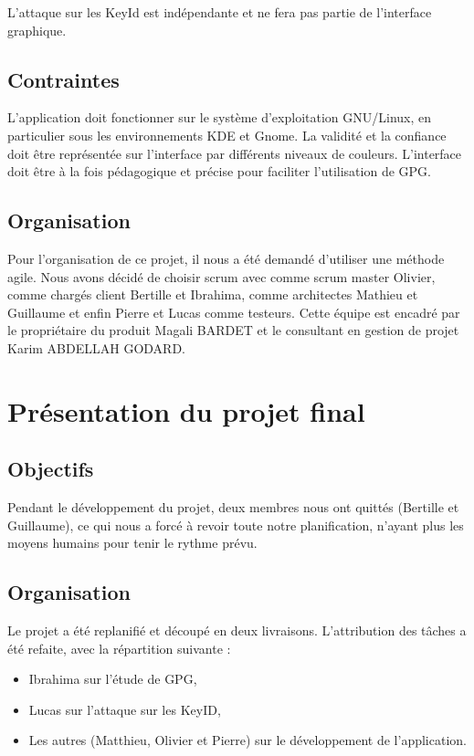 \documentclass{../res/univ-projet}
\begin{document}
  L'attaque sur les KeyId est indépendante et ne fera pas partie de l'interface graphique. 
  
  \subsection{Contraintes}
  
  L'application doit fonctionner sur le système d'exploitation GNU/Linux, en particulier sous les environnements KDE et Gnome. La validité et la confiance doit être représentée sur l'interface par différents niveaux de couleurs.
  L'interface doit être à la fois pédagogique et précise pour faciliter l'utilisation de GPG.
  
  
  \subsection{Organisation}
  
  Pour l'organisation de ce projet, il nous a été demandé d'utiliser une méthode agile. Nous avons décidé de choisir scrum avec comme scrum master Olivier, comme chargés client Bertille et Ibrahima, comme architectes Mathieu et Guillaume et enfin Pierre et Lucas comme testeurs. Cette équipe est encadré par le propriétaire du produit Magali BARDET et le consultant en gestion de projet 	Karim ABDELLAH GODARD.
  
  \newpage

\section{Présentation du projet final}
  \subsection{Objectifs}
    Pendant le développement du projet, deux membres nous ont quittés (Bertille et Guillaume), ce qui nous a forcé à revoir toute notre planification, n'ayant plus les moyens humains pour tenir le rythme prévu.
  \subsection{Organisation}
    
    Le projet a été replanifié et découpé en deux livraisons.
    L'attribution des tâches a été refaite, avec la répartition suivante :
    \begin{itemize}
      \item Ibrahima sur l'étude de GPG,
      \item Lucas sur l'attaque sur les KeyID,
      \item Les autres (Matthieu, Olivier et Pierre) sur le développement de l'application.
    \end{itemize}
\end{document}
